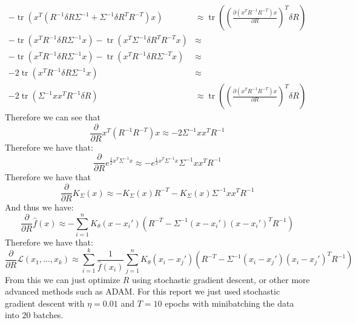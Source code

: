 \documentclass[10pt]{article}
\DeclareMathOperator{\Tr}{tr}
\begin{document}
\begin{align*}
    -\Tr\left(x^T \left(R^{-1}\delta R \Sigma^{-1} + \Sigma^{-1}\delta R^T R^{-T}\right)x\right) &\approx \Tr\left(\left(\frac{\partial(x^TR^{-1}R^{-T})x}{\partial R}\right)^T  \delta R\right)\\
    -\Tr\left(x^T R^{-1}\delta R \Sigma^{-1}x\right) -\Tr\left( x^T\Sigma^{-1}\delta R^T R^{-T}x\right)&\approx\\
    -\Tr\left(x^T R^{-1}\delta R \Sigma^{-1}x\right)-\Tr\left( x^TR^{-1}\delta R \Sigma^{-T} x\right)&\approx\\
    -2\Tr\left(x^T R^{-1}\delta R \Sigma^{-1}x\right) &\approx\\
    -2\Tr\left( \Sigma^{-1}xx^T R^{-1}\delta R\right) &\approx \Tr\left(\left(\frac{\partial(x^TR^{-1}R^{-T})x}{\partial R}\right)^T  \delta R\right)
\end{align*}
Therefore we can see that 
\begin{equation}
    \frac{\partial}{\partial R} x^T(R^{-1}R^{-T})x \approx -2\Sigma^{-1}xx^T R^{-1}
\end{equation}
Therefore we have that:
\begin{equation}
    \frac{\partial}{\partial R} e^{\frac{1}{2}x^T\Sigma^{-1}x} \approx -e^{\frac{1}{2}x^T\Sigma^{-1}x} \Sigma^{-1}xx^T R^{-1}
\end{equation}
Therefore we have that
\begin{equation}
    \frac{\partial}{\partial R} K_{\Sigma}(x) \approx -K_{\Sigma}(x)R^{-T} - K_{\Sigma}(x)\Sigma^{-1}xx^T R^{-1}
\end{equation}
And thus we have:
\begin{equation}
    \frac{\partial}{\partial R} \hat{f}(x) \approx -\sum_{i=1}^n K_{\theta}(x-x_i')\left(R^{-T} - \Sigma^{-1}(x-x_i')(x-x_i')^T R^{-1}\right)
\end{equation}
Therefore we have that:
\begin{equation}
    \frac{\partial}{\partial R}\mathcal{L}(x_1,\dots,x_k) \approx \sum_{i=1}^k \frac{1}{\hat{f}(x_i)} \sum_{j=1}^n K_{\theta}(x_i-x_j')\left(R^{-T} - \Sigma^{-1}(x_i-x_j')(x_i-x_j')^T R^{-1}\right)
\end{equation}
From this we can just optimize $R$ using stochastic gradient descent, or other more advanced methods such as ADAM. For this 
report we just used stochastic gradient descent with $\eta=0.01$ and $T=10$ epochs with minibatching the data into 20 batches.
\end{document}
